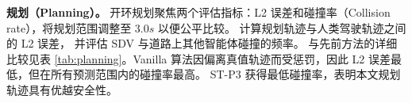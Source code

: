 \documentclass[runningheads]{llncs}
\begin{document}


\noindent\textbf{规划（Planning）。} 开环规划聚焦两个评估指标：L2 误差和碰撞率（Collision rate），将规划范围调整至 $3.0s$ 以便公平比较。
%
计算规划轨迹与人类驾驶轨迹之间的 L2 误差，
并评估 SDV 与道路上其他智能体碰撞的频率。
%
%
与先前方法的详细比较见表 \ref{tab:planning}。Vanilla 算法因偏离真值轨迹而受惩罚，因此 L2 误差最低，但在所有预测范围内的碰撞率最高。
%
ST-P3 获得最低碰撞率，表明本文规划轨迹具有优越安全性。
%
\end{document}
